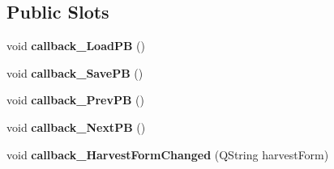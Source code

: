 \subsection*{Public Slots}
\begin{DoxyCompactItemize}
\item 
void {\bfseries callback\+\_\+\+Load\+PB} ()\hypertarget{classnmf_estimation___tab2_a4f081c9228c16d7bfc430c719bab9fea}{}\label{classnmf_estimation___tab2_a4f081c9228c16d7bfc430c719bab9fea}

\item 
void {\bfseries callback\+\_\+\+Save\+PB} ()\hypertarget{classnmf_estimation___tab2_aaae777a753a648698472f1b80a0ee84a}{}\label{classnmf_estimation___tab2_aaae777a753a648698472f1b80a0ee84a}

\item 
void {\bfseries callback\+\_\+\+Prev\+PB} ()\hypertarget{classnmf_estimation___tab2_ae41c2f59eb16add1033d18bfce26b5ba}{}\label{classnmf_estimation___tab2_ae41c2f59eb16add1033d18bfce26b5ba}

\item 
void {\bfseries callback\+\_\+\+Next\+PB} ()\hypertarget{classnmf_estimation___tab2_a4ddbed0f122af965a66316e1994523b5}{}\label{classnmf_estimation___tab2_a4ddbed0f122af965a66316e1994523b5}

\item 
void {\bfseries callback\+\_\+\+Harvest\+Form\+Changed} (Q\+String harvest\+Form)\hypertarget{classnmf_estimation___tab2_a330174fcdd6956c61cf25b013eb7fa6d}{}\label{classnmf_estimation___tab2_a330174fcdd6956c61cf25b013eb7fa6d}

\end{DoxyCompactItemize}
